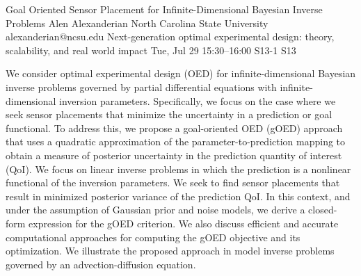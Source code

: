 \begin{talk}
  {Goal Oriented Sensor Placement for Infinite-Dimensional Bayesian Inverse Problems}%
  {Alen Alexanderian}%
  {North Carolina State University}%
  {alexanderian@ncsu.edu}%
  {Next-generation optimal experimental design: theory, scalability, and real world impact}%
  {}%
  {Tue, Jul 29 15:30–16:00}%
  {S13-1}%
  {S13}%
				
			
We consider optimal experimental design (OED) for infinite-dimensional Bayesian
inverse problems governed by partial differential equations with
infinite-dimensional inversion parameters.  Specifically, we focus on the case
where we seek sensor placements that minimize the uncertainty in a prediction or
goal functional.  To address this, we propose a goal-oriented OED (gOED)
approach that uses a quadratic approximation of the parameter-to-prediction
mapping to obtain a measure of posterior uncertainty in the prediction quantity
of interest (QoI).  We focus on linear inverse problems in which the prediction
is a nonlinear functional of the inversion parameters. We seek to find sensor
placements that result in minimized posterior variance of the prediction QoI. In
this context, and under the assumption of Gaussian prior and noise models, we
derive a closed-form expression for the gOED criterion. We also discuss
efficient and accurate computational approaches for computing the gOED objective
and its optimization.  We illustrate the proposed approach in model inverse
problems governed by an advection-diffusion equation.

\medskip

\end{talk}

